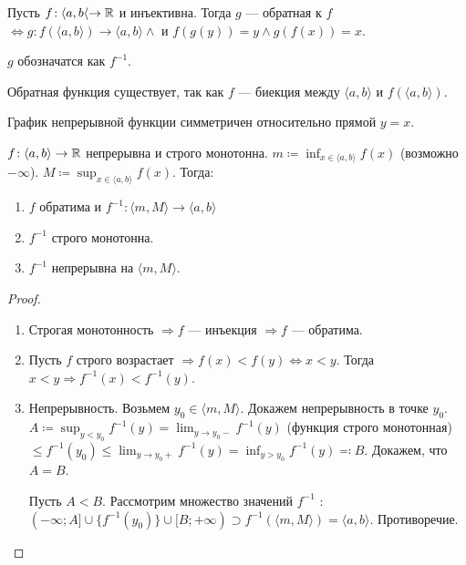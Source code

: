 \begin{definition}
    Пусть $f\!: \langle a, b \langle \to \mathbb{R}$ и инъективна. Тогда  $g$ --- обратная к  $f$  $\iff g\!: f(\langle a, b\rangle) \to \langle a, b \rangle \land$ и  $f(g(y)) = y \land g(f(x)) = x$.

    $g$ обозначатся как  $f^{-1}$.
\end{definition}
\begin{remark}
    Обратная функция существует, так как $f$ --- биекция между  $\langle a, b \rangle$ и  $f(\langle a, b \rangle)$.
\end{remark}
\begin{remark}
    График непрерывной функции симметричен относительно прямой $y=x$.
\end{remark}
\begin{theorem}
    $f\!: \langle a, b\rangle \to \mathbb{R}$ непрерывна и строго монотонна. $m \coloneqq \inf_{x \in \langle a, b \rangle} f(x)$ (возможно $-\infty$). $M \coloneqq \sup_{x \in \langle a, b \rangle} f(x)$. Тогда:
    \begin{enumerate}
        \item $f$ обратима и  $f^{-1}\!: \langle m, M \rangle \to \langle a, b \rangle$
        \item  $f^{-1}$ строго монотонна.
        \item  $f^{-1}$ непрерывна на  $\langle m, M \rangle$.
    \end{enumerate}
\end{theorem}
\begin{proof}
    \slashn
    \begin{enumerate}
        \item Строгая монотонность $\Rightarrow f$ --- инъекция  $\Rightarrow f$ --- обратима.
        \item  Пусть  $f$ строго возрастает  $\Rightarrow f(x) < f(y) \iff x < y$.  Тогда $x < y \Rightarrow f^{-1}(x) < f^{-1}(y)$.
        \item Непрерывность. Возьмем  $y_0 \in \langle m, M \rangle$. Докажем непрерывность в точке $y_0$.  $A \coloneqq \sup_{y < y_0} f^{-1}(y) = \lim_{y \to y_0-} f^{-1}(y)$ (функция строго монотонная) $\le f^{-1}(y_0) \le \lim_{y \to y_0+} f^{-1}(y) = \inf_{y > y_0} f^{-1}(y) \eqqcolon B$. Докажем, что $A = B$.

            Пусть $A < B$. Рассмотрим множество значений  $f^{-1}$ : $(-\infty; A] \cup \{f^{-1}(y_0)\} \cup [B; +\infty) \supset f^{-1}(\langle m, M \rangle) = \langle a, b \rangle$. Противоречие. 
    \end{enumerate}
\end{proof}

